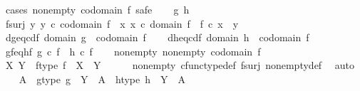 \begin{isabellebody}
\isamarkupfalse%
\ {\isacharparenleft}{\kern0pt}cases\ {\isachardoublequoteopen}nonempty\ {\isacharparenleft}{\kern0pt}codomain\ f{\isacharparenright}{\kern0pt}{\isachardoublequoteclose}{\isacharcomma}{\kern0pt}\ safe{\isacharparenright}{\kern0pt}\isanewline
\ \ \isamarkupfalse%
\ g\ h\isanewline
\ \ \isamarkupfalse%
\ f{\isacharunderscore}{\kern0pt}surj{\isacharcolon}{\kern0pt}\ {\isachardoublequoteopen}{\isasymforall}y{\isachardot}{\kern0pt}\ y\ {\isasymin}\isactrlsub c\ codomain\ f\ {\isasymlongrightarrow}\ {\isacharparenleft}{\kern0pt}{\isasymexists}x{\isachardot}{\kern0pt}\ x\ {\isasymin}\isactrlsub c\ domain\ f\ {\isasymand}\ f\ {\isasymcirc}\isactrlsub c\ x\ {\isacharequal}{\kern0pt}\ y{\isacharparenright}{\kern0pt}{\isachardoublequoteclose}\isanewline
\ \ \isamarkupfalse%
\ d{\isacharunderscore}{\kern0pt}g{\isacharunderscore}{\kern0pt}eq{\isacharunderscore}{\kern0pt}cd{\isacharunderscore}{\kern0pt}f{\isacharcolon}{\kern0pt}\ {\isachardoublequoteopen}domain\ g\ {\isacharequal}{\kern0pt}\ codomain\ f{\isachardoublequoteclose}\isanewline
\ \ \isamarkupfalse%
\ d{\isacharunderscore}{\kern0pt}h{\isacharunderscore}{\kern0pt}eq{\isacharunderscore}{\kern0pt}cd{\isacharunderscore}{\kern0pt}f{\isacharcolon}{\kern0pt}\ {\isachardoublequoteopen}domain\ h\ {\isacharequal}{\kern0pt}\ codomain\ f{\isachardoublequoteclose}\isanewline
\ \ \isamarkupfalse%
\ gf{\isacharunderscore}{\kern0pt}eq{\isacharunderscore}{\kern0pt}hf{\isacharcolon}{\kern0pt}\ {\isachardoublequoteopen}g\ {\isasymcirc}\isactrlsub c\ f\ {\isacharequal}{\kern0pt}\ h\ {\isasymcirc}\isactrlsub c\ f{\isachardoublequoteclose}\isanewline
\ \ \isamarkupfalse%
\ nonempty{\isacharcolon}{\kern0pt}\ {\isachardoublequoteopen}nonempty\ {\isacharparenleft}{\kern0pt}codomain\ f{\isacharparenright}{\kern0pt}{\isachardoublequoteclose}\isanewline
\isanewline
\ \ \isamarkupfalse%
\ X\ Y\ \ f{\isacharunderscore}{\kern0pt}type{\isacharcolon}{\kern0pt}\ {\isachardoublequoteopen}f\ {\isacharcolon}{\kern0pt}\ X\ {\isasymrightarrow}\ Y{\isachardoublequoteclose}\isanewline
\ \ \ \ \isamarkupfalse%
\ nonempty\ cfunc{\isacharunderscore}{\kern0pt}type{\isacharunderscore}{\kern0pt}def\ f{\isacharunderscore}{\kern0pt}surj\ nonempty{\isacharunderscore}{\kern0pt}def\ \isamarkupfalse%
\ auto\isanewline
\ \ \isamarkupfalse%
\ A\ \ g{\isacharunderscore}{\kern0pt}type{\isacharcolon}{\kern0pt}\ {\isachardoublequoteopen}g\ {\isacharcolon}{\kern0pt}\ Y\ {\isasymrightarrow}\ A{\isachardoublequoteclose}\ \ h{\isacharunderscore}{\kern0pt}type{\isacharcolon}{\kern0pt}\ {\isachardoublequoteopen}h\ {\isacharcolon}{\kern0pt}\ Y\ {\isasymrightarrow}\ A{\isachardoublequoteclose}\isanewline

\end{isabellebody}
